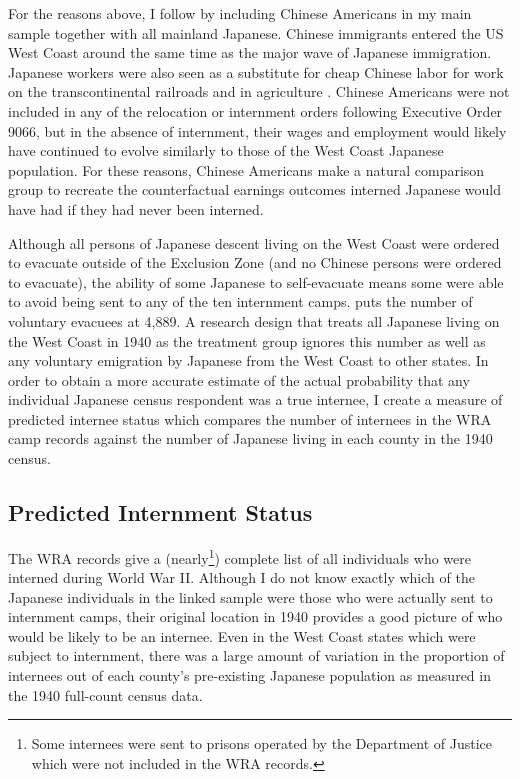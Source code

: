 For the reasons above, 
I follow \cite{arellano-boverDisplacementDiversityMobility2022} 
by including Chinese Americans in my main sample
together with all mainland Japanese.
Chinese immigrants entered the US West Coast 
around the same time as the major wave of Japanese immigration.
Japanese workers were also seen as a substitute for cheap Chinese labor 
for work on the transcontinental railroads and in agriculture 
\citep{chenImpactSkillBasedImmigration2015}.
Chinese Americans were not included in any of the relocation 
or internment orders following Executive Order 9066,
but in the absence of internment, 
their wages and employment would likely have continued to evolve similarly 
to those of the West Coast Japanese population.
For these reasons, Chinese Americans make a natural comparison group 
to recreate the counterfactual earnings outcomes interned Japanese 
would have had if they had never been interned.

Although all persons of Japanese descent living on the West Coast
were ordered to evacuate outside of the Exclusion Zone
(and no Chinese persons were ordered to evacuate),
the ability of some Japanese to self-evacuate
means some were able to avoid being sent to any of the ten internment camps.
\cite{dewittjohnl.FinalReportJapanese1943} puts the number of
voluntary evacuees at 4,889.
A research design that treats all Japanese living on the West Coast in 1940
as the treatment group ignores this number
as well as any voluntary emigration by Japanese
from the West Coast to other states.
In order to obtain a more accurate estimate of the actual
probability that any individual Japanese census respondent was a true internee,
I create a measure of predicted internee status
which compares the number of internees in the WRA camp records
against the number of Japanese living in each county in the 1940 census.

\subsection{Predicted Internment Status}\label{sec:data-intern}

The WRA records give a 
(nearly\footnote{Some internees were sent to prisons operated by the 
Department of Justice which were not included in the WRA records.}) 
complete list of all individuals who were interned during World War II.
Although I do not know exactly which of the Japanese individuals 
in the linked sample were those who were actually sent to internment camps,
their original location in 1940 provides a good picture of who would
be likely to be an internee.
Even in the West Coast states which were subject to internment, 
there was a large amount of variation in the proportion of internees
out of each county's pre-existing Japanese population
as measured in the 1940 full-count census data.

